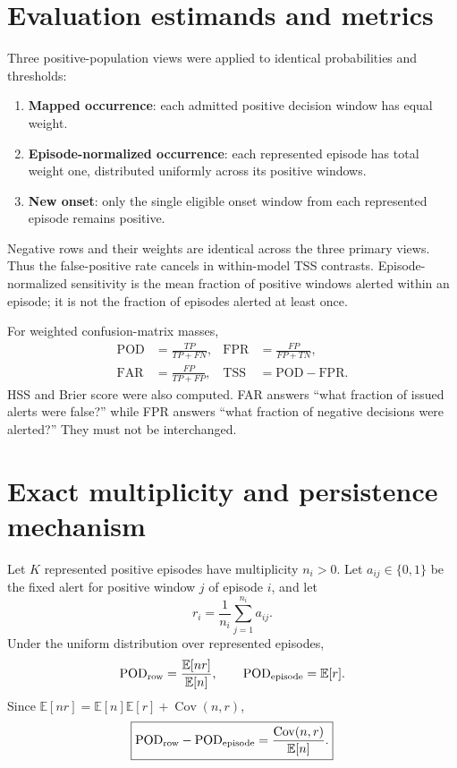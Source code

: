 \documentclass[11pt]{article}
\newcommand{\TSS}{\mathrm{TSS}}
\newcommand{\POD}{\mathrm{POD}}
\newcommand{\FPR}{\mathrm{FPR}}
\newcommand{\FAR}{\mathrm{FAR}}
\newcommand{\E}{\mathbb{E}}
\newcommand{\Cov}{\operatorname{Cov}}
\begin{document}
\section{Evaluation estimands and metrics}

Three positive-population views were applied to identical probabilities and thresholds:

\begin{enumerate}
\item \textbf{Mapped occurrence}: each admitted positive decision window has equal weight.
\item \textbf{Episode-normalized occurrence}: each represented episode has total weight one, distributed uniformly across its positive windows.
\item \textbf{New onset}: only the single eligible onset window from each represented episode remains positive.
\end{enumerate}

Negative rows and their weights are identical across the three primary views. Thus the false-positive rate cancels in within-model TSS contrasts. Episode-normalized sensitivity is the mean fraction of positive windows alerted within an episode; it is not the fraction of episodes alerted at least once.

For weighted confusion-matrix masses,
\begin{align}
\POD &= \frac{TP}{TP+FN}, &
\FPR &= \frac{FP}{FP+TN},\\
\FAR &= \frac{FP}{TP+FP}, &
\TSS &= \POD-\FPR.
\end{align}
HSS and Brier score were also computed. FAR answers ``what fraction of issued alerts were false?'' while FPR answers ``what fraction of negative decisions were alerted?'' They must not be interchanged.

\section{Exact multiplicity and persistence mechanism}

Let $K$ represented positive episodes have multiplicity $n_i>0$. Let $a_{ij}\in\{0,1\}$ be the fixed alert for positive window $j$ of episode $i$, and let
\[
r_i=\frac{1}{n_i}\sum_{j=1}^{n_i}a_{ij}.
\]
Under the uniform distribution over represented episodes,
\[
\POD_{\rm row}=\frac{\E[nr]}{\E[n]},\qquad
\POD_{\rm episode}=\E[r].
\]
Since $\E[nr]=\E[n]\E[r]+\Cov(n,r)$,
\begin{equation}
\boxed{\POD_{\rm row}-\POD_{\rm episode}
=\frac{\Cov(n,r)}{\E[n]}.}
\label{eq:cov}
\end{equation}
\end{document}
